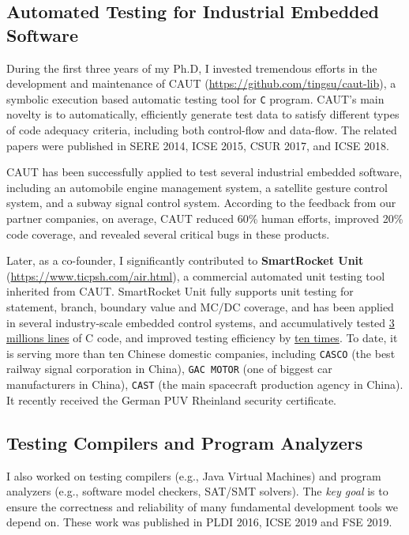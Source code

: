 \documentclass[a4paper]{article}
\begin{document}
\subsection{Automated Testing for Industrial Embedded Software}
\label{unit_testing}

During the first three years of my Ph.D, I invested tremendous efforts in the development and maintenance of CAUT (\url{https://github.com/tingsu/caut-lib}), a symbolic execution based automatic testing tool for \texttt{C} program. CAUT's main novelty is to automatically, efficiently generate test data to satisfy different types of code adequacy criteria, including both control-flow and data-flow. The related papers were published in SERE 2014, ICSE 2015, CSUR 2017, and ICSE 2018.

CAUT has been successfully applied to test several industrial embedded software, including an automobile engine management system, a satellite gesture control system, and a subway signal control system.  According to the feedback from our partner companies, on average, CAUT reduced 60\% human efforts, improved 20\% code coverage, and revealed several critical bugs in these products. 

Later, as a co-founder, I significantly contributed to \textbf{SmartRocket Unit} (\url{https://www.ticpsh.com/air.html}), a commercial automated unit testing tool inherited from CAUT. SmartRocket Unit fully supports unit testing for statement, branch, boundary value and MC/DC coverage, and has been applied in several industry-scale embedded control systems, and accumulatively tested \underline{3 millions lines} of C code, and improved testing efficiency by \underline{ten times}.
To date, it is serving more than ten Chinese domestic companies, including \texttt{CASCO} (the best railway signal
corporation in China), \texttt{GAC MOTOR} (one of biggest car manufacturers in China), \texttt{CAST} (the main spacecraft production agency in China). It recently received the German PUV Rheinland security certificate.


\subsection{Testing Compilers and Program Analyzers}
\label{testing_analyzers}

I also worked on testing compilers (e.g., Java Virtual Machines) and program analyzers (e.g., software model checkers, SAT/SMT solvers). The \emph{key goal} is to ensure the correctness and reliability of many fundamental development tools we depend on. These work was published in PLDI 2016, ICSE 2019 and FSE 2019.
\end{document}
